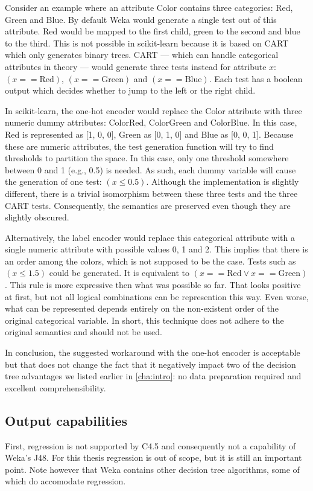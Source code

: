 Consider an example where an attribute Color contains three categories: Red, Green and Blue. By default Weka would generate a single test out of this attribute. Red would be mapped to the first child, green to the second and blue to the third. This is not possible in scikit-learn because it is based on CART which only generates binary trees. CART --- which can handle categorical attributes in theory --- would generate three tests instead for attribute $x$: $(x == \text{Red})$, $(x == \text{Green})$ and $(x == \text{Blue})$. Each test has a boolean output which decides whether to jump to the left or the right child. 

In scikit-learn, the one-hot encoder would replace the Color attribute with three numeric dummy attributes: ColorRed, ColorGreen and ColorBlue. In this case, Red is represented as [1, 0, 0], Green as [0, 1, 0] and Blue as [0, 0, 1]. Because these are numeric attributes, the test generation function will try to find thresholds to partition the space. In this case, only one threshold somewhere between 0 and 1 (e.g., 0.5) is needed. As such, each dummy variable will cause the generation of one test: $(x \leqslant 0.5)$. Although the implementation is slightly different, there is a trivial isomorphism between these three tests and the three CART tests. Consequently, the semantics are preserved even though they are slightly obscured.

Alternatively, the label encoder would replace this categorical attribute with a single numeric attribute with possible values 0, 1 and 2. This implies that there is an order among the colors, which is not supposed to be the case. Tests such as $(x \leqslant 1.5)$ could be generated. It is equivalent to $(x == \text{Red} \lor x == \text{Green})$. This rule is more expressive then what was possible so far. That looks positive at first, but not all logical combinations can be represention this way. Even worse, what can be represented depends entirely on the non-existent order of the original categorical variable. In short, this technique does not adhere to the original semantics and should not be used.

In conclusion, the suggested workaround with the one-hot encoder is acceptable but that does not change the fact that it negatively impact two of the decision tree advantages we listed earlier in \autoref{cha:intro}: no data preparation required and excellent comprehensibility.


\subsection{Output capabilities}
First, regression is not supported by C4.5 and consequently not a capability of Weka's J48. For this thesis regression is out of scope, but it is still an important point. Note however that Weka contains other decision tree algorithms, some of which do accomodate regression.

